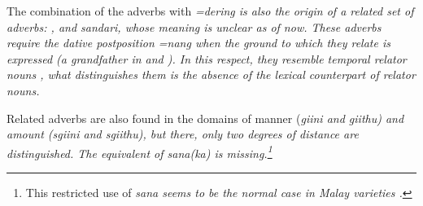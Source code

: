 
The combination of the adverbs with  \em =dering \em is also the origin of a related set of adverbs: ,  and \em sandari\em, whose meaning is unclear as of now. These adverbs require the dative postposition \em =nang \em when the ground to which they relate is expressed (a grandfather in  and ). In this respect, they resemble temporal relator nouns , what distinguishes them is the absence of the lexical counterpart of relator nouns.





Related adverbs are also found in the domains of manner (\em giini \em and \em giithu\em) and amount (\em sgiini \em and \em sgiithu\em), but there, only two degrees of distance are distinguished. The equivalent of \em sana(ka) \em is missing.\footnote{This restricted use of \em sana \em seems to be the normal case in Malay varieties \citep[cf.][276]{Paauw2008phd}.}




